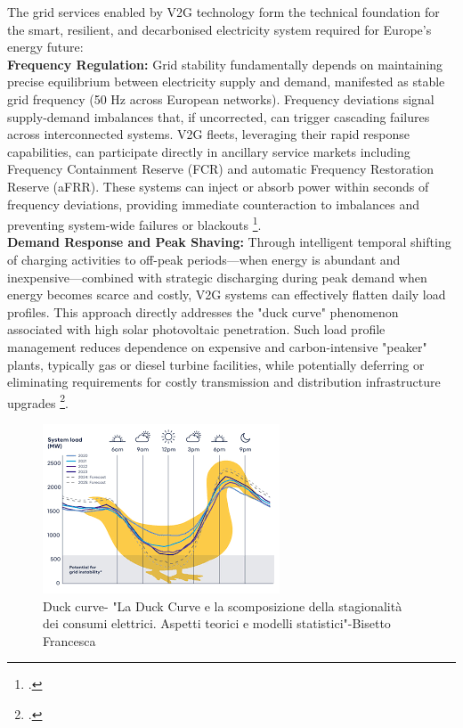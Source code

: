 \noindent
The grid services enabled by V2G technology form the technical foundation for the smart, resilient, and decarbonised electricity system required for Europe's energy future:
\\
    \noindent
 \textbf{Frequency Regulation:} Grid stability fundamentally depends on maintaining precise equilibrium between electricity supply and demand, manifested as stable grid frequency (50 Hz across European networks). Frequency deviations signal supply-demand imbalances that, if uncorrected, can trigger cascading failures across interconnected systems. V2G fleets, leveraging their rapid response capabilities, can participate directly in ancillary service markets including Frequency Containment Reserve (FCR) and automatic Frequency Restoration Reserve (aFRR). These systems can inject or absorb power within seconds of frequency deviations, providing immediate counteraction to imbalances and preventing system-wide failures or blackouts \footcite{alfaverh2022optima, white2011vehicle}.
   \\
    \noindent 
\textbf{Demand Response and Peak Shaving:} Through intelligent temporal shifting of charging activities to off-peak periods—when energy is abundant and inexpensive—combined with strategic discharging during peak demand when energy becomes scarce and costly, V2G systems can effectively flatten daily load profiles. This approach directly addresses the "duck curve" phenomenon associated with high solar photovoltaic penetration. Such load profile management reduces dependence on expensive and carbon-intensive "peaker" plants, typically gas or diesel turbine facilities, while potentially deferring or eliminating requirements for costly transmission and distribution infrastructure upgrades \footcite{orfanoudakis2022deep, sadeghi2021deep}.
    \begin{figure}[H]
        \centering
        \includegraphics[width=1\linewidth]{duck.png}
        \caption{Duck curve- "La Duck Curve e la scomposizione della stagionalità dei
 consumi elettrici. Aspetti teorici e modelli statistici"-Bisetto Francesca}
        \label{fig:placeholder}
    \end{figure}
